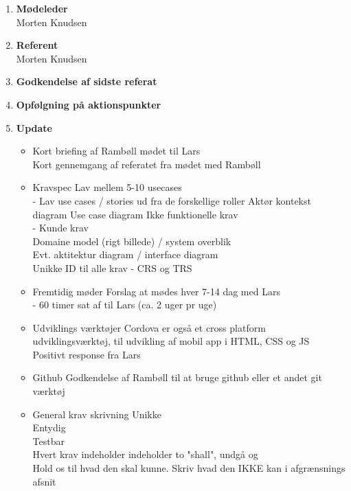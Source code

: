	\begin{enumerate}
		\itemsep 0.3em 
		\item \textbf{Mødeleder}\\
			Morten Knudsen
		\item \textbf{Referent}\\
			Morten Knudsen
		\item \textbf{Godkendelse af sidste referat}
			
		\item\textbf{Opfølgning på aktionspunkter}

		\item \textbf{Update}
			\begin{itemize}[-]
			\item Kort briefing af Rambøll mødet til Lars\\
			Kort gennemgang af referatet fra mødet med Rambøll	\\
			
			\item Kravspec
			Lav mellem 5-10 usecases \\
			 - Lav use cases / stories ud fra de forskellige roller
			Aktør kontekst diagram
			Use case diagram
			Ikke funktionelle krav \\
			 - Kunde krav \\
			Domaine model (rigt billede) / system overblik \\
			Evt. aktitektur diagram / interface diagram \\
			Unikke ID til alle krav - CRS og TRS\\
						
			\item Fremtidig møder
			Forslag at mødes hver 7-14 dag med Lars \\
			- 60 timer sat af til Lars (ca. 2 uger pr uge) \\
			
			\item Udviklings værktøjer
			Cordova er også et cross platform udviklingsværktøj, til udvikling af mobil app i HTML, CSS og JS \\
			
			Positivt response fra Lars \\
			
			\item Github
			Godkendelse af Rambøll til at bruge github eller et andet git værktøj
			
			\item General krav skrivning
			Unikke \\
			Entydig \\
			Testbar \\
			Hvert krav indeholder indeholder to "shall", undgå og \\
			Hold os til hvad den skal kunne. Skriv hvad den IKKE kan i afgrænsnings afsnit \\
			

\end{itemize}
\end{enumerate}
